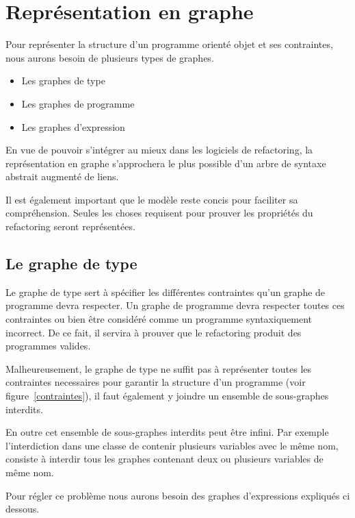 \documentclass[a4paper, 12pt]{article}
\begin{document}
  \newpage

  \section{Représentation en graphe}
  Pour représenter la structure d'un programme orienté objet et ses contraintes, nous aurons besoin de plusieurs types de graphes.

  \begin{itemize}[label=\textbullet]
    \item Les graphes de type
    \item Les graphes de programme
    \item Les graphes d'expression
  \end{itemize}

  En vue de pouvoir s'intégrer au mieux dans les logiciels de refactoring, la représentation en graphe s'approchera le plus possible d'un arbre de syntaxe abstrait augmenté de liens.

  Il est également important que le modèle reste concis pour faciliter sa compréhension. Seules les choses requisent pour prouver les propriétés du refactoring seront représentées.

  \subsection{Le graphe de type}

  Le graphe de type sert à spécifier les différentes contraintes qu'un graphe de programme devra respecter.
  Un graphe de programme devra respecter toutes ces contraintes ou bien être considéré comme un programme syntaxiquement incorrect.
  De ce fait, il servira à prouver que le refactoring produit des programmes valides.

  Malheureusement, le graphe de type ne suffit pas à représenter toutes les contraintes necessaires pour garantir la structure d'un programme (voir figure~\ref{contraintes}),
  il faut également y joindre un ensemble de sous-graphes interdits.

  En outre cet ensemble de sous-graphes interdits peut être infini. Par exemple l'interdiction dans une classe de contenir plusieurs variables avec le même nom,
  consiste à interdir tous les graphes contenant deux ou plusieurs variables de même nom.

  Pour régler ce problème nous aurons besoin des graphes d'expressions expliqués ci dessous.\label{subsec:grapheExpression}
\end{document}
